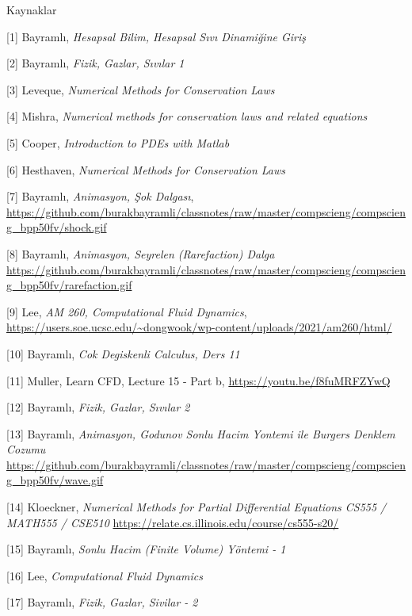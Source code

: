 \documentclass[12pt,fleqn]{article}\usepackage{../../common}
\begin{document}
Kaynaklar

[1] Bayramlı, {\em Hesapsal Bilim, Hesapsal Sıvı Dinamiğine Giriş}

[2] Bayramlı, {\em Fizik, Gazlar, Sıvılar 1}

[3] Leveque, {\em Numerical Methods for Conservation Laws}

[4] Mishra, {\em Numerical methods for conservation laws and related equations}

[5] Cooper, {\em Introduction to PDEs with Matlab}

[6] Hesthaven, {\em Numerical Methods for Conservation Laws}

[7] Bayramlı, {\em Animasyon, Şok Dalgası},
    \url{https://github.com/burakbayramli/classnotes/raw/master/compscieng/compscieng_bpp50fv/shock.gif}

[8] Bayramlı, {\em Animasyon, Seyrelen (Rarefaction) Dalga}
    \url{https://github.com/burakbayramli/classnotes/raw/master/compscieng/compscieng_bpp50fv/rarefaction.gif}

[9] Lee, {\em AM 260, Computational Fluid Dynamics},
    \url{https://users.soe.ucsc.edu/~dongwook/wp-content/uploads/2021/am260/html/}

[10] Bayramlı, {\em Cok Degiskenli Calculus, Ders 11}

[11] Muller, {Learn CFD, Lecture 15 - Part b},
     \url{https://youtu.be/f8fuMRFZYwQ}

[12] Bayramlı, {\em Fizik, Gazlar, Sıvılar 2}


[13] Bayramlı, {\em Animasyon, Godunov Sonlu Hacim Yontemi ile Burgers Denklem Cozumu}
    \url{https://github.com/burakbayramli/classnotes/raw/master/compscieng/compscieng_bpp50fv/wave.gif}

[14] Kloeckner, {\em Numerical Methods for Partial Differential Equations CS555 / MATH555 / CSE510}
    \url{https://relate.cs.illinois.edu/course/cs555-s20/}

[15] Bayramlı, {\em Sonlu Hacim (Finite Volume) Yöntemi - 1}

[16] Lee, {\em Computational Fluid Dynamics}

[17] Bayramlı, {\em Fizik, Gazlar, Sivilar - 2}
\end{document}
